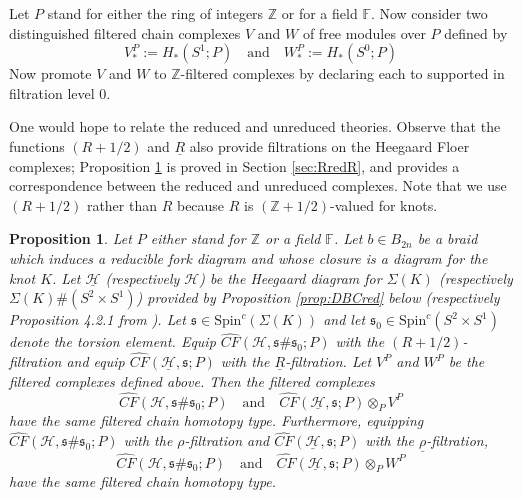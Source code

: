 \documentclass[11pt]{article}
\theoremstyle{plain} \newtheorem{thm}{Theorem}[subsection]
\theoremstyle{plain} \newtheorem{cor}[thm]{Corollary}
\theoremstyle{plain} \newtheorem{prop}[thm]{Proposition}
\theoremstyle{plain} \newtheorem{conj}[thm]{Conjecture}
\theoremstyle{plain} \newtheorem{lem}[thm]{Lemma}
\theoremstyle{definition} \newtheorem{df}[thm]{Definition}
\theoremstyle{remark} \newtheorem{rmk}[thm]{Remark}
\theoremstyle{remark} \newtheorem{obs}[thm]{Observation}
\newcommand{\B}[1]{B_{#1} }
\newcommand{\DBCs}[1]{\Sigma(#1)\#(S^{2}\times S^{1})}
\newcommand{\SxS}{S^{2}\times S^{1}}
\newcommand{\DBC}[1]{\Sigma(#1)}
\newcommand{\h}{\mathcal{H}}
\newcommand{\red}[1]{\underline{#1}}
\numberwithin{equation}{section}
\begin{document}
Let $P$ stand for either the ring of integers $\mathbb{Z}$ or for a field $\mathbb{F}$.  Now consider two distinguished filtered chain complexes $V$ and $W$ of free modules over $P$ defined by
$$ V^P_{*} := H_{*}\left(S^1; P\right) \quad \text{and} \quad W^P_{*}:= H_{*}\left( S^0; P \right)$$
Now promote $V$ and $W$ to $\mathbb{Z}$-filtered complexes by declaring each to supported in filtration level $0$.

One would hope to relate the reduced and unreduced theories.  Observe that the functions $(R+1/2)$ and $\red{R}$ also provide filtrations on the Heegaard Floer complexes; Proposition \ref{prop:RredR} is proved in Section \ref{sec:RredR}, and provides a correspondence between the reduced and unreduced complexes.  Note that we use $(R+1/2)$ rather than $R$ because $R$ is $(\mathbb{Z}+1/2)$-valued for knots.

\begin{prop}\label{prop:RredR}
Let $P$ either stand for $\mathbb{Z}$ or a field $\mathbb{F}$.  Let $b \in \B{2n}$ be a braid which induces a reducible fork diagram and whose closure is a diagram for the knot $K$.  Let $\red{\h}$ (respectively $\h$) be the Heegaard diagram for $\DBC{K}$ (respectively $\DBCs{K}$) provided by Proposition \ref{prop:DBCred} below (respectively Proposition 4.2.1 from \cite{et:R}).  Let $\mathfrak{s} \in \text{Spin}^{c}(\DBC{K})$ and let $\mathfrak{s}_{0} \in \text{Spin}^{c}(\SxS)$ denote the torsion element.  Equip $\widehat{CF}(\h, \mathfrak{s}\#\mathfrak{s}_{0}; P)$ with the $(R+1/2)$-filtration and equip $\widehat{CF}(\red{\h}, \mathfrak{s}; P)$ with the $\red{R}$-filtration.  Let $V^P$ and $W^P$ be the filtered complexes defined above.  Then the filtered complexes
\begin{equation*}
\widehat{CF}(\h, \mathfrak{s} \# \mathfrak{s}_{0}; P) \quad \text{and} \quad \widehat{CF}(\red{\h}, \mathfrak{s}; P) \otimes_{P} V^P
\end{equation*}
have the same filtered chain homotopy type.  Furthermore, equipping  $\widehat{CF}(\h, \mathfrak{s}\#\mathfrak{s}_{0};P)$ with the $\rho$-filtration and $\widehat{CF}(\red{\h}, \mathfrak{s};P)$ with the $\red{\rho}$-filtration,
\begin{equation*}
\widehat{CF}(\h, \mathfrak{s} \# \mathfrak{s}_{0};P) \quad \text{and} \quad \widehat{CF}(\red{\h}, \mathfrak{s};P) \otimes_{P} W^P
\end{equation*}
have the same filtered chain homotopy type.
\end{prop}
\end{document}
